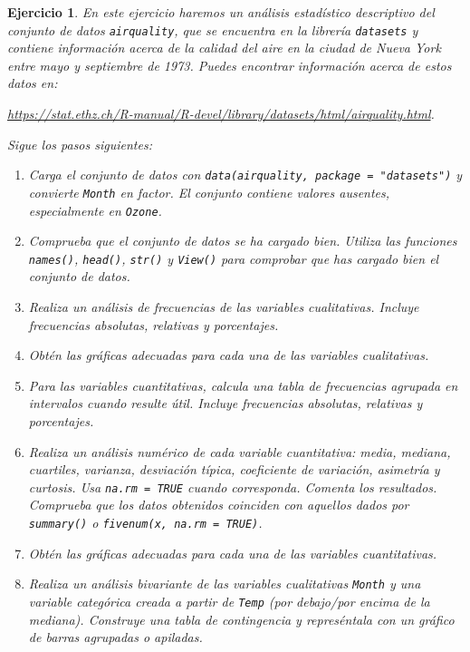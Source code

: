 \documentclass[11pt,a4paper]{article}
\theoremstyle{exercise}
\newtheorem{exercise}{Ejercicio}
\begin{document}
\begin{exercise} En este ejercicio haremos un análisis estadístico descriptivo del conjunto de datos \texttt{airquality}, que se encuentra en la librería \texttt{datasets} y contiene información acerca de la calidad del aire en la ciudad de Nueva York entre mayo y septiembre de 1973. Puedes encontrar información acerca de estos datos en:

\begin{center}
	\url{https://stat.ethz.ch/R-manual/R-devel/library/datasets/html/airquality.html}.
\end{center}

Sigue los pasos siguientes:

\begin{enumerate}
	\item Carga el conjunto de datos con \texttt{data(airquality, package = "datasets")} y convierte \texttt{Month} en factor. El conjunto contiene valores ausentes, especialmente en \texttt{Ozone}.

	\item Comprueba que el conjunto de datos se ha cargado bien. Utiliza las funciones \texttt{names()}, \texttt{head()}, \texttt{str()} y \texttt{View()} para comprobar que has cargado bien el conjunto de datos.

	\item Realiza un análisis de frecuencias de las variables cualitativas. Incluye frecuencias absolutas, relativas y porcentajes.

	\item Obtén las gráficas adecuadas para cada una de las variables cualitativas. 

	\item Para las variables cuantitativas, calcula una tabla de frecuencias agrupada en intervalos cuando resulte útil. Incluye frecuencias absolutas, relativas y porcentajes.
	
	\item Realiza un análisis numérico de cada variable cuantitativa: media, mediana, cuartiles, varianza, desviación típica, coeficiente de variación, asimetría y curtosis. Usa \texttt{na.rm = TRUE} cuando corresponda. Comenta los resultados. Comprueba que los datos obtenidos coinciden con aquellos dados por \texttt{summary()} o \texttt{fivenum(x, na.rm = TRUE)}.

	\item Obtén las gráficas adecuadas para cada una de las variables cuantitativas.
	
	\item Realiza un análisis bivariante de las variables cualitativas \texttt{Month} y una variable categórica creada a partir de \texttt{Temp} (por debajo/por encima de la mediana). Construye una tabla de contingencia y represéntala con un gráfico de barras agrupadas o apiladas.


\end{enumerate}
\end{exercise}
\end{document}

